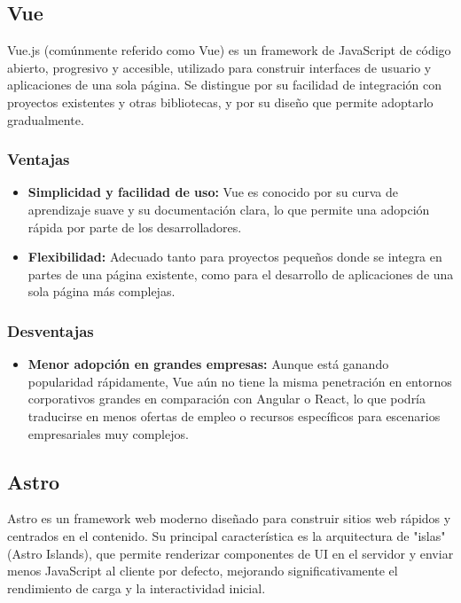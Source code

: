 \subsection{Vue}
Vue.js (comúnmente referido como Vue) es un framework de JavaScript de código abierto, progresivo y accesible, utilizado para construir interfaces de usuario y aplicaciones de una sola página. Se distingue por su facilidad de integración con proyectos existentes y otras bibliotecas, y por su diseño que permite adoptarlo gradualmente.

\subsubsection{Ventajas}
\begin{itemize}
\item \textbf{Simplicidad y facilidad de uso:} Vue es conocido por su curva de aprendizaje suave y su documentación clara, lo que permite una adopción rápida por parte de los desarrolladores.
\item \textbf{Flexibilidad:} Adecuado tanto para proyectos pequeños donde se integra en partes de una página existente, como para el desarrollo de aplicaciones de una sola página más complejas.
\end{itemize}

\subsubsection{Desventajas}
\begin{itemize}
\item \textbf{Menor adopción en grandes empresas:} Aunque está ganando popularidad rápidamente, Vue aún no tiene la misma penetración en entornos corporativos grandes en comparación con Angular o React, lo que podría traducirse en menos ofertas de empleo o recursos específicos para escenarios empresariales muy complejos.
\end{itemize}

\subsection{Astro}
Astro es un framework web moderno diseñado para construir sitios web rápidos y centrados en el contenido. Su principal característica es la arquitectura de "islas" (Astro Islands), que permite renderizar componentes de UI en el servidor y enviar menos JavaScript al cliente por defecto, mejorando significativamente el rendimiento de carga y la interactividad inicial.

